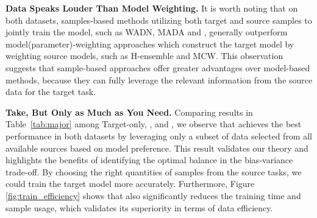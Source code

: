 
\textbf{Data Speaks Louder Than Model Weighting.} It is worth noting that on both datasets, samples-based methods utilizing both target and source samples to jointly train the model, such as WADN, MADA and \ourmethod{},
generally outperform model(parameter)-weighting approaches which construct the target model by weighting source models, such as H-ensemble and MCW. This observation suggests that sample-based approaches offer greater advantages over model-based methods, because they can fully leverage the relevant information from the source data for the target task.



\textbf{Take, But Only as Much as You Need.} 
Comparing results in Table~\ref{tab:major} among Target-only, \allsource{}, and \ourmethod{}, we observe that \ourmethod{} achieves the best performance in both datasets by leveraging only a subset of data selected from all available sources based on model preference. This result validates our theory and highlights the benefits of identifying the optimal balance in the bias-variance trade-off. By choosing the right quantities of samples from the source tasks, we could train the target model more accurately. Furthermore, Figure \ref{fig:train_efficiency} shows that \ourmethod{} also significantly reduces the training time and sample usage, which validates its superiority in terms of data efficiency.


